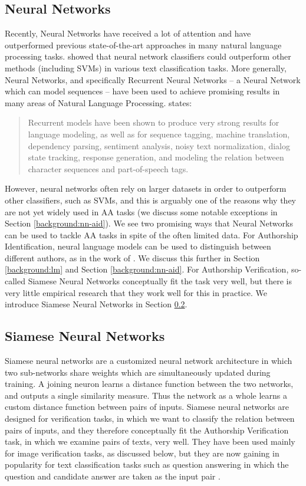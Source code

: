 \subsection{Neural Networks}
Recently, Neural Networks have received a lot of attention and have outperformed previous state-of-the-art approaches in many natural language processing tasks. \citet{lai2015recurrent} showed that neural network classifiers could outperform other methods (including SVMs) in various text classification tasks. More generally, Neural Networks, and specifically Recurrent Neural Networks -- a Neural Network which can model sequences -- have been used to achieve promising results in many areas of Natural Language Processing. \citet{goldberg2016primer} states:

\begin{quote}
Recurrent models have been shown to produce very strong results for language modeling, as well as for sequence tagging, machine translation, dependency parsing, sentiment analysis, noisy text normalization, dialog state tracking, response generation, and modeling the relation between character sequences and part-of-speech tags.    
\end{quote}

However, neural networks often rely on larger datasets in order to outperform other classifiers, such as SVMs, and this is arguably one of the reasons why they are not yet widely used in AA tasks (we discuss some notable exceptions in Section \ref{background:nn-aid}). We see two promising ways that Neural Networks can be used to tackle AA tasks in spite of the often limited data. For Authorship Identification, neural language models can be used to distinguish between different authors, as in the work of \citet{bagnall2015author,bagnall2016authorship}. We discuss this further in Section \ref{background:lm} and Section \ref{background:nn-aid}. For Authorship Verification, so-called Siamese Neural Networks conceptually fit the task very well, but there is very little empirical research that they work well for this in practice. We introduce Siamese Neural Networks in Section \ref{background:siamese}. 


\subsection{Siamese Neural Networks}
\label{background:siamese}
Siamese neural networks are a customized neural network architecture in which two sub-networks share weights which are simultaneously updated during training. A joining neuron learns a distance function between the two networks, and outputs a single similarity measure. Thus the network as a whole learns a custom distance function between pairs of inputs. Siamese neural networks are designed for verification tasks, in which we want to classify the relation between pairs of inputs, and they therefore conceptually fit the Authorship Verification task, in which we examine pairs of texts, very well. They have been used mainly for image verification tasks, as discussed below, but they are now gaining in popularity for text classification tasks such as question answering in which the question and candidate answer are taken as the input pair \citet{yin2016abcnn}.

